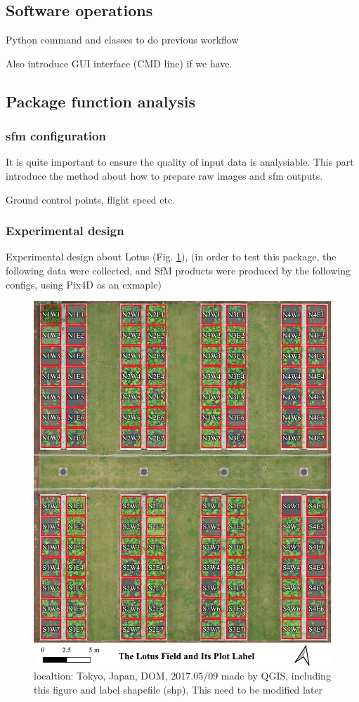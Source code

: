 \documentclass{configs/bmcart}
\begin{document}
\subsection*{Software operations}
Python command and classes to do previous workflow

Also introduce GUI interface (CMD line) if we have.

\subsection*{Package function analysis}

\subsubsection*{\acrshort{sfm} configuration}
It is quite important to ensure the quality of input data is analysiable. This part introduce the method about how to prepare raw images and \acrshort{sfm} outputs. 

Ground control points, flight speed etc.

\subsubsection*{Experimental design}
Experimental design about Lotus (Fig.  \ref{fig:plotid}), (in order to test this package, the following data were collected, and SfM products were produced by the following configs, using Pix4D as an exmaple)

\begin{figure}[htbp]
\includegraphics[width=0.95\linewidth]{figures/plot_with_id.pdf}
\caption{localtion: Tokyo, Japan, DOM, 2017.05/09 made by QGIS, including this figure and label shapefile (shp), This need to be modified later}
\label{fig:plotid}
\end{figure}
\end{document}
